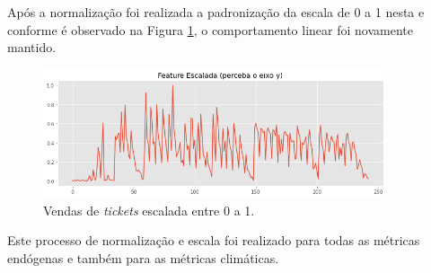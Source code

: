                 
                        \begin{figure}[H]
                        \end{figure}
                        
                        
                        Após a normalização foi realizada a padronização da escala de 0 a 1 nesta  e conforme é observado na Figura  \ref{fig:feature_sem_outliers_escalada}, o comportamento linear foi novamente mantido.
                        
                        \begin{figure}[H]
                        	\center
                        	{                    		
                            	\includegraphics[width=0.9\textwidth]{./Figuras/resultados/feature_sem_outliers_escalada.png}
                            	\caption{Vendas de \textit{tickets} escalada entre 0 a 1.} \label{fig:feature_sem_outliers_escalada} 
                        	}
                        \end{figure}
                       
                Este processo de normalização e escala foi realizado para todas as métricas endógenas e também para as métricas climáticas.
        	   

